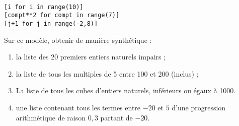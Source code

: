 \exer{}
\setcounter{numques}{0}

\begin{lstlisting}

[i for i in range(10)]
[compt**2 for compt in range(7)]
[j+1 for j in range(-2,8)]
\end{lstlisting}

Sur ce modèle, obtenir de manière synthétique : 
\begin{enumerate}[label=\emph{\alph*)}]
  \item la liste des 20 premiers entiers naturels impairs ;
  \item la liste de tous les multiples de 5 entre 100 et 200 (inclus) ;
  \item La liste de tous les cubes d'entiers naturels, inférieurs ou égaux à 1000. 
  \item une liste contenant tous les termes entre $-20$ et $5$ d'une progression arithmétique de raison $0,3$ partant de $-20$.
\end{enumerate}